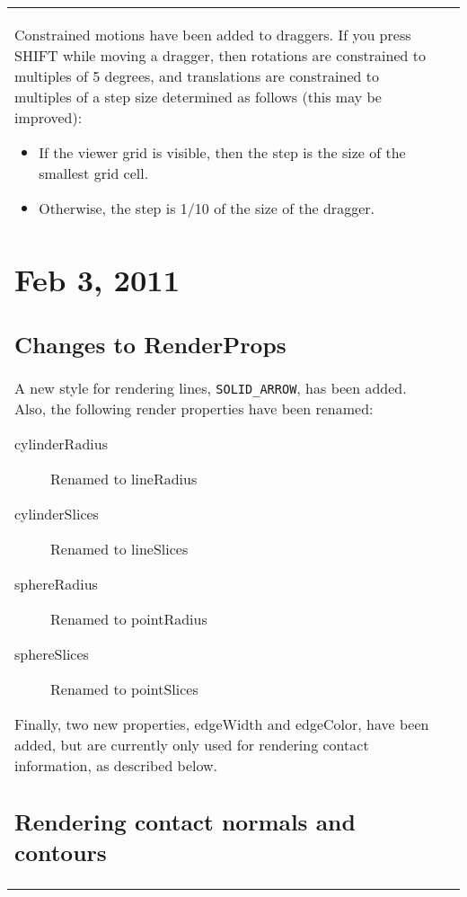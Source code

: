 \documentclass{article}
\begin{document}
\begin{tabular}{ll}
Constrained motions have been added to draggers. If you press SHIFT
while moving a dragger, then rotations are constrained to multiples of
5 degrees, and translations are constrained to multiples of a step
size determined as follows (this may be improved):

\begin{itemize}

\item If the viewer grid is visible, then the step is the size of the
smallest grid cell.

\item Otherwise, the step is 1/10 of the size of the dragger.

\end{itemize}

\section*{Feb 3, 2011}

\subsection*{Changes to RenderProps}

A new style for rendering lines, {\tt SOLID\_ARROW}, has been added.  Also,
the following render properties have been renamed:

\begin{description}

\item[cylinderRadius] \mbox{}

Renamed to {\sf lineRadius}

\item[cylinderSlices] \mbox{}

Renamed to {\sf lineSlices}

\item[sphereRadius] \mbox{}

Renamed to {\sf pointRadius}

\item[sphereSlices] \mbox{}

Renamed to {\sf pointSlices}

\end{description}

Finally, two new properties, {\sf edgeWidth} and {\sf edgeColor}, have been
added, but are currently only used for rendering contact information,
as described below.

\subsection*{Rendering contact normals and contours}


\end{tabular}
\end{document}
